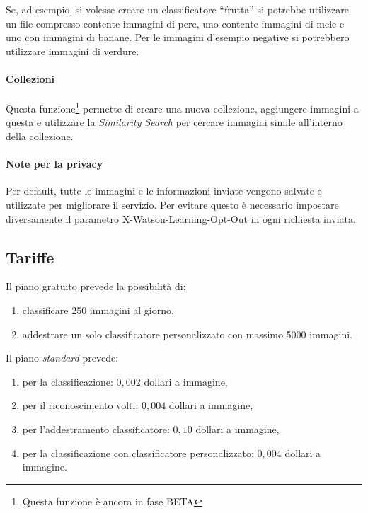 Se, ad esempio, si volesse creare un classificatore ``frutta'' si potrebbe utilizzare un file compresso contente immagini di pere, uno contente immagini di mele e uno con immagini di banane.
Per le immagini d'esempio negative si potrebbero utilizzare immagini di verdure.

\paragraph{Collezioni} Questa funzione\footnote{Questa funzione è ancora in fase BETA} permette di creare una nuova collezione, aggiungere immagini a questa e utilizzare la \textit{Similarity Search} per cercare immagini simile all'interno della collezione.

\paragraph{Note per la privacy} Per default, tutte le immagini e le informazioni inviate vengono salvate e utilizzate per migliorare il servizio. Per evitare questo è necessario impostare diversamente il parametro \textsf{X-Watson-Learning-Opt-Out} in ogni richiesta inviata.

\subsection{Tariffe}
Il piano gratuito prevede la possibilità di:
\begin{enumerate}
\item classificare 250 immagini al giorno,
\item addestrare un solo classificatore personalizzato con massimo 5000 immagini.
\end{enumerate}
Il piano \textit{standard} prevede:
\begin{enumerate}
\item per la classificazione: $0,002$ dollari a immagine,
\item per il riconoscimento volti: $0,004$ dollari a immagine,
\item per l'addestramento classificatore: $0,10$ dollari a immagine,
\item per la classificazione con classificatore personalizzato: $0,004$ dollari a immagine.
\end{enumerate}



